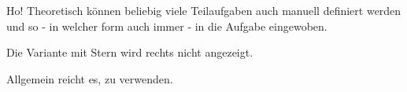 \begin{exercise}{Ho!}
   Theoretisch können beliebig viele Teilaufgaben auch manuell definiert werden und so - in welcher form auch immer - in die Aufgabe eingewoben.

   Die Variante mit Stern wird rechts nicht angezeigt.

   Allgemein reicht es, \string\Subtask\space zu verwenden.
\end{exercise}